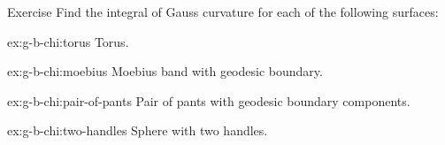 \begin{thm}{Exercise}\label{ex:g-b-chi}
Find the integral of Gauss curvature for each of the following surfaces:

\begin{subthm}{ex:g-b-chi:torus}
Torus.
\end{subthm}

\begin{subthm}{ex:g-b-chi:moebius}
Moebius band with geodesic boundary.
\end{subthm}

\begin{subthm}{ex:g-b-chi:pair-of-pants}
Pair of pants with geodesic boundary components.
\end{subthm}

\begin{subthm}{ex:g-b-chi:two-handles}
Sphere with two handles.
\end{subthm}

\end{thm}

